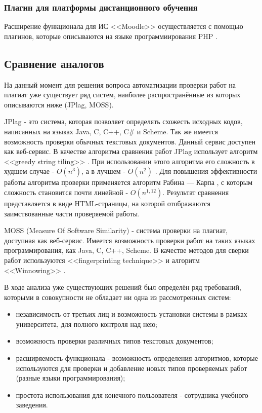 		\subsubsection{Плагин для платформы дистанционного обучения}

			Расширение функционала для ИС <<Moodle>> осуществляется с помощью плагинов, которые описываются на языке программиирования PHP \cite{Moore2010}. 

	\subsection{Сравнение аналогов}

		На данный момент для решения вопроса автоматизации проверки работ на плагиат уже существует ряд систем, наиболее распространённые из которых описываются ниже (JPlag, MOSS).

		JPlag - это система, которая позволяет определять схожесть исходных кодов, написанных на языках Java, C, C++, C\# и Scheme. Так же имеется возможность проверки обычных текстовых документов. Данный сервис доступен как веб-сервис. В качестве алгоритма сравнения работ JPlag использует алгоритм <<greedy string tiling>> \cite{Wise1993}. При использовании этого алгоритма его сложность в худшем случае - $O(n^3)$, а в лучшем - $O(n^2)$ \cite{Prechelt2002}.  Для повышения эффективности работы алгоритма проверки применяется алгоритм Рабина — Карпа \cite{Burrows2007} \cite{Karp1987}, с которым сложность становится почти линейной - $O(n^{1,12})$. Результат сравнения представляется в виде HTML-страницы, на которой отображаются заимствованные части проверяемой работы.

		MOSS (Measure Of Software Similarity) - система проверки на плагиат, доступная как веб-сервис. Имеется возможность проверки работ на таких языках программирования, как Java, C, C++, Scheme. В качестве методов для сверки работ используются <<fingerprinting technique>> и алгоритм <<Winnowing>> \cite{Winnowing2003}.		

		В ходе анализа уже существующих решений был определён ряд требований, которыми в совокупности не обладает ни одна из рассмотренных систем:
		\begin{itemize}
			\item независимость от третьих лиц и возможность установки системы в рамках университета, для полного контроля над нею;
			\item возможность проверки различных типов текстовых документов;
			\item расширяемость функционала - возможность определения алгоритмов, которые используются для проверки и добавление новых типов проверяемых работ (разные языки программирования);
			\item простота использования для конечного пользователя - сотрудника учебного заведения.
		\end{itemize}

